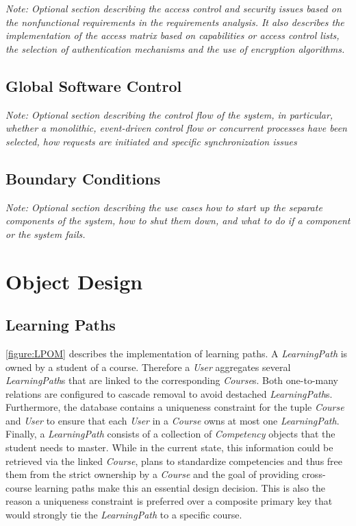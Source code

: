 \documentclass[a4paper,12pt,twoside]{report}
\begin{document}
\textit{Note: Optional section describing the access control and security issues based on the nonfunctional requirements in the requirements analysis. It also describes the implementation of the access matrix based on capabilities or access control lists, the selection of  authentication mechanisms and the use of encryption algorithms.}

\section{Global Software Control}

\textit{Note: Optional section describing the control flow of the system, in particular, whether a monolithic, event-driven control flow or concurrent processes have been selected, how requests are initiated and specific synchronization issues}


\section{Boundary Conditions}

\textit{Note: Optional section describing the use cases how to start up the separate components of the system, how to shut them down, and what to do if a component or the system fails.}






\chapter{Object Design}
\label{chapter:ObjectDesign}


\section{Learning Paths}
\label{section:LearningPaths}

\autoref{figure:LPOM} describes the implementation of learning paths. A \textit{LearningPath}
is owned by a student of a course. Therefore a \textit{User} aggregates several \textit{LearningPath}s
that are linked to the corresponding \textit{Course}s. Both one-to-many relations are configured to
cascade removal to avoid destached \textit{LearningPath}s. Furthermore, the database contains a
uniqueness constraint for the tuple \textit{Course} and \textit{User} to ensure that each \textit{User}
in a \textit{Course} owns at most one \textit{LearningPath}. Finally, a \textit{LearningPath} consists
of a collection of \textit{Competency} objects that the student needs to master. While in the current state,
this information could be retrieved via the linked \textit{Course}, plans to standardize competencies
and thus free them from the strict ownership by a \textit{Course} and the goal of providing
cross-course learning paths make this an essential design decision. This is also the reason a uniqueness
constraint is preferred over a composite primary key that would strongly tie the \textit{LearningPath}
to a specific course.
\end{document}
